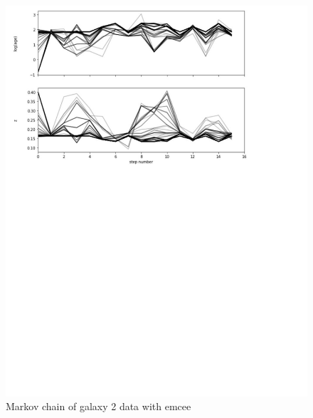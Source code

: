 \documentclass{article}
\begin{document}
\begin{figure}[H]
  \centering
\includegraphics[scale=0.5]{Markov chain Galaxy 2}
\caption{Markov chain of galaxy 2 data with emcee}
\end{figure}
\end{document}
